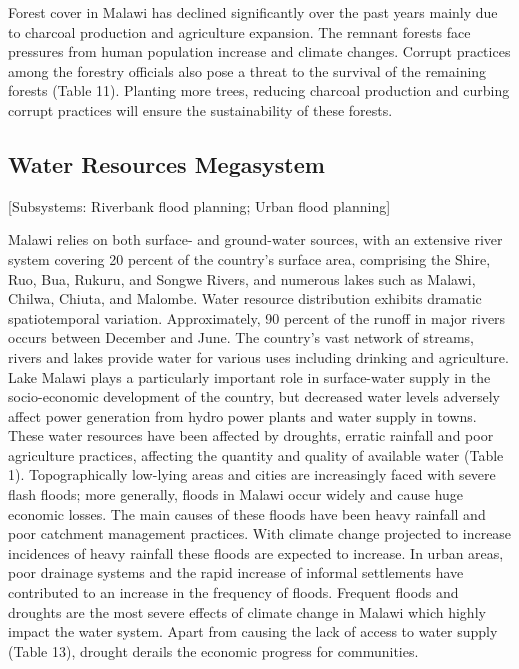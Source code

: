 \documentclass[
]{book}
\begin{document}
Forest cover in Malawi has declined significantly over the past years mainly due to charcoal production and agriculture expansion. The remnant forests face pressures from human population increase and climate changes. Corrupt practices among the forestry officials also pose a threat to the survival of the remaining forests (Table 11). Planting more trees, reducing charcoal production and curbing corrupt practices will ensure the sustainability of these forests.

\hypertarget{water-resources-megasystem}{%
\subsection{Water Resources Megasystem}\label{water-resources-megasystem}}

{[}Subsystems: Riverbank flood planning; Urban flood planning{]}

Malawi relies on both surface- and ground-water sources, with an extensive river system covering 20 percent of the country's surface area, comprising the Shire, Ruo, Bua, Rukuru, and Songwe Rivers, and numerous lakes such as Malawi, Chilwa, Chiuta, and Malombe. Water resource distribution exhibits dramatic spatiotemporal variation. Approximately, 90 percent of the runoff in major rivers occurs between December and June. The country's vast network of streams, rivers and lakes provide water for various uses including drinking and agriculture. Lake Malawi plays a particularly important role in surface-water supply in the socio-economic development of the country, but decreased water levels adversely affect power generation from hydro power plants and water supply in towns. These water resources have been affected by droughts, erratic rainfall and poor agriculture practices, affecting the quantity and quality of available water (Table 1). Topographically low-lying areas and cities are increasingly faced with severe flash floods; more generally, floods in Malawi occur widely and cause huge economic losses. The main causes of these floods have been heavy rainfall and poor catchment management practices. With climate change projected to increase incidences of heavy rainfall these floods are expected to increase. In urban areas, poor drainage systems and the rapid increase of informal settlements have contributed to an increase in the frequency of floods. Frequent floods and droughts are the most severe effects of climate change in Malawi which highly impact the water system. Apart from causing the lack of access to water supply (Table 13), drought derails the economic progress for communities.
\end{document}
